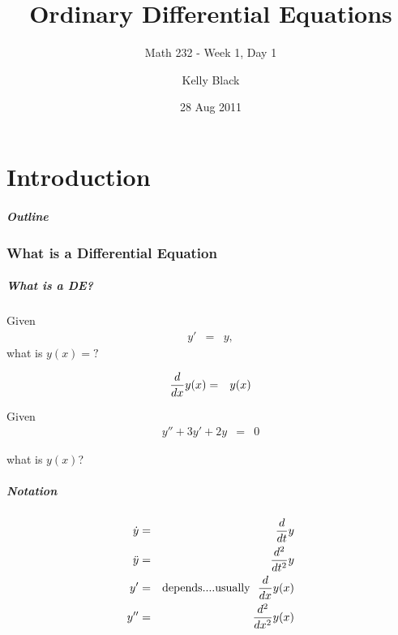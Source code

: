 \part{Introduction}


\title{Ordinary Differential Equations}
\subtitle{Math 232 - Week 1, Day 1}

\author{Kelly Black}
\date{28 Aug 2011}

\begin{frame}
  \titlepage
\end{frame}

\begin{frame}
  \frametitle{Outline}
\end{frame}


\section{What is a Differential Equation}


\begin{frame}
  \frametitle{What is a DE?}

  Given
  \begin{eqnarray*}
    y' & = & y,
  \end{eqnarray*}
  what is $y(x)=?$

  \begin{eqnarray*}
    \deriv{y(x)}{x} & = & y(x)
  \end{eqnarray*}

\end{frame}


\begin{frame}
  Given
  \begin{eqnarray*}
    y'' + 3y' +2y & = & 0
  \end{eqnarray*}

  what is $y(x)$?

\end{frame}

\begin{frame}
  \frametitle{Notation}
  \begin{eqnarray*}
    \dot{y} & = & \deriv{y}{t} \\
    \ddot{y} & = & \derivTwo{y}{t} \\
    y' & = & \mathrm{depends.... usually ~~} \deriv{y(x)}{x} \\
    y'' & = & \derivTwo{y(x)}{x}
  \end{eqnarray*}
\end{frame}


